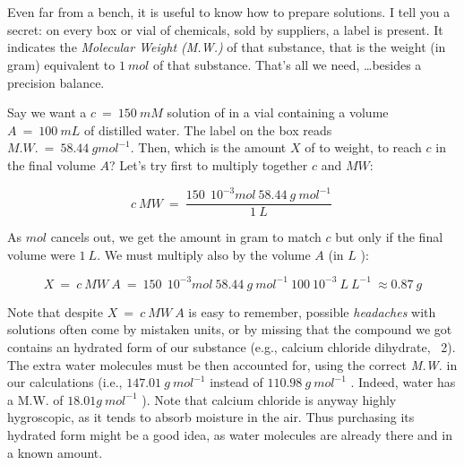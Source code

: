 \begin{svgraybox}
	\\
	\\
	Even far from a bench, it is useful to know how to prepare solutions. I tell you a secret: on every box or vial of chemicals, sold by suppliers, a label is present. It indicates the \textit{Molecular Weight (M.W.)} of that substance, that is the weight (in gram) equivalent to \( 1\ mol \) of that substance. That's all we need, \ldots besides a precision balance.  
	
	Say we want a \(c\ =\ 150\ mM \) solution of  in a vial containing a volume \(A\ =\ 100\ mL \) of distilled water. The label on the box reads \( M.W.\ =\ 58.44\ g mol^{ - 1}\). Then, which is the amount \( X \) of  to weight, to reach \( c \) in the final volume \( A \)? Let's try first to multiply together \( c \) and \( MW \):

	\[
	 c\ MW\ =\ \frac{150\ \ 10^{-3} mol\ 58.44\ g\ mol^{ - 1}}{1\ L}\ 
	\]

	As \( mol \) cancels out, we get the amount in gram to match \( c \) but only if the final volume were \( 1\ L \). We must multiply also by the volume \( A \) (in \( L \) ):

	\[
	 X\ =\ c\ MW\ A\ =\ 150\ \ 10^{-3} mol\ 58.44\ g\ mol^{ -1}\ 100\ 10^{-3}\ L \ L^{ - 1 }\ \approx 0.87\ g 
	\]

	Note that despite \( X\ =\ c\ MW\ A \) is easy to remember, possible \textit{headaches} with solutions often come by mistaken units, or by missing that the compound we got contains an hydrated form of our substance (e.g., calcium chloride dihydrate, \ 2). The extra water molecules must be then accounted for, using the correct \textit{M.W.} in our calculations (i.e., \( 147.01\ g\ mol^{ - 1 } \) instead of \( 110.98\ g\ mol^{ - 1 }\) . Indeed, water has a M.W. of \( 18.01 g\ mol^{ - 1 }\) ). Note that calcium chloride is anyway highly hygroscopic, as it tends to absorb moisture in the air. Thus purchasing its hydrated form might be a good idea, as water molecules are already there and in a known amount.
\end{svgraybox}

